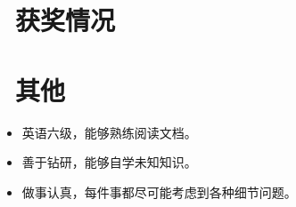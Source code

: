 \documentclass{resume}
\begin{document}
\section{\faHeartO\ 获奖情况}

\section{\faInfo\ 其他}
\begin{itemize}[parsep=0.5ex]
  \item 英语六级，能够熟练阅读文档。
  \item 善于钻研，能够自学未知知识。
  \item 做事认真，每件事都尽可能考虑到各种细节问题。
\end{itemize}

%
%
\end{document}
